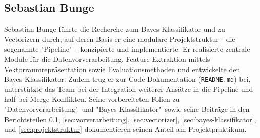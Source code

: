 \subsection{Sebastian Bunge}
\label{sec:sebastian}

Sebastian Bunge f\"uhrte die Recherche zum Bayes-Klassifikator und zu Vectorizern durch, auf deren Basis er eine modulare Projektstruktur - die sogenannte "Pipeline"\ - konzipierte und implementierte. Er realisierte zentrale Module f\"ur die Datenvorverarbeitung, Feature-Extraktion mittels Vektorraumrepr\"asentation sowie Evaluationsmethoden und entwickelte den Bayes-Klassifikator. Zudem trug er zur Code-Dokumentation (\texttt{README.md}) bei, unterst\"utzte das Team bei der Integration weiterer Ans\"atze in die Pipeline und half bei Merge-Konflikten. Seine vorbereiteten Folien zu "Datenvorverarbeitung"\ und "Bayes-Klassifikator"\ sowie seine Beitr\"age in den Berichtsteilen \ref{sec:sebastian}, \ref{sec:vorverarbeitung}, \ref{sec:vectorizer}, \ref{sec:bayes-klassifikator}, und \ref{sec:projektstruktur} dokumentieren seinen Anteil am Projektpraktikum.
